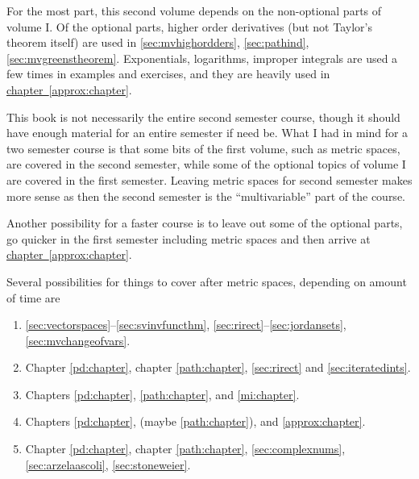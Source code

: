 \documentclass[12pt]{book}
\makeatletter
\newcommand{\volIref}[1]{#1\@}
\theoremstyle{plain}
\theoremstyle{remark}
\theoremstyle{definition}
\theoremstyle{exercise}
\theoremstyle{example}
\newcommand{\chapterref}[1]{\hyperref[#1]{chapter~\ref*{#1}}}
\makeatother
\begin{document}
For the most part, this second volume
depends on the non-optional parts of volume I\@.
Of the optional parts, higher order derivatives (but not Taylor's theorem
itself) are used
in \ref{sec:mvhighordders}, \ref{sec:pathind},
\ref{sec:mvgreenstheorem}.  Exponentials, logarithms, improper integrals are
used a few times in examples and exercises, and they are heavily used in
\chapterref{approx:chapter}.

This book is not necessarily the entire second semester course,
though it should have enough material for an entire semester if need be.
What I had in mind for a two semester course is that some bits of the
first volume, such as metric spaces, are
covered in the second semester, while some of the optional topics of volume
I are covered in the first semester.  Leaving metric spaces for second
semester makes more sense as then the second
semester is the ``multivariable'' part of the course.

Another possibility for a faster course
is to leave out some of the optional parts, go quicker in the first semester
including metric spaces and then arrive at \chapterref{approx:chapter}.

Several possibilities for things to cover after metric spaces,
depending on amount of time are
\begin{enumerate}[1)]
\item
\ref{sec:vectorspaces}--\ref{sec:svinvfuncthm},
\ref{sec:rirect}--\ref{sec:jordansets}, \ref{sec:mvchangeofvars}.
\item
Chapter \ref{pd:chapter}, chapter \ref{path:chapter},
\ref{sec:rirect} and \ref{sec:iteratedints}.
\item Chapters \ref{pd:chapter}, \ref{path:chapter}, and
\ref{mi:chapter}.
\item
Chapters \ref{pd:chapter}, (maybe \ref{path:chapter}), and \ref{approx:chapter}.
\item
Chapter \ref{pd:chapter}, chapter \ref{path:chapter}, 
\ref{sec:complexnums},
\ref{sec:arzelaascoli},
\ref{sec:stoneweier}.
\end{enumerate}

\end{document}
